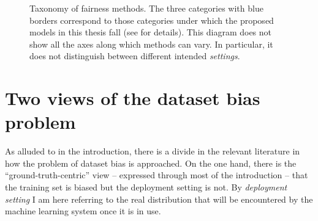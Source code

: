 \begin{figure}[tbp]  \caption{%
    Taxonomy of fairness methods. The three categories with blue borders correspond to those
    categories under which the proposed models in this thesis fall (see  for
    details). This diagram does not show all the axes along which methods can vary. In particular,
  it does not distinguish between different intended \emph{settings}. }%
\label{fig:fairness-taxonomy} \end{figure}%
%
\section{Two views of the dataset bias problem}\label{two-views-of-the-dataset-bias-problem} As
alluded to in the introduction, there is a divide in the relevant literature in how the problem of
dataset bias is approached. On the one hand, there is the ``ground-truth-centric'' view --
expressed through most of the introduction -- that the training set is biased but the deployment
setting is not. By \emph{deployment setting} I am here referring to the real distribution that will
be encountered by the machine learning system once it is in use.


